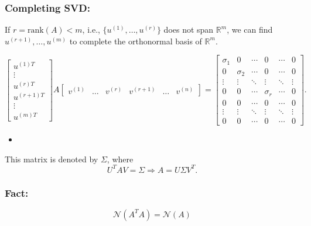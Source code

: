 \subsubsection{Completing SVD:}
\begin{derivation}
    If \( r = \text{rank}(A) < m \), i.e., \( \{ u^{(1)}, \dots, u^{(r)} \} \) does not span \( \mathbb{R}^m \), we can find \( u^{(r+1)}, \dots, u^{(m)} \) to complete the orthonormal basis of \( \mathbb{R}^m \).

    \[
    \begin{bmatrix}
    u^{(1) T} \\
    \vdots \\
    u^{(r) T} \\
    u^{(r+1) T} \\
    \vdots \\
    u^{(m) T}
    \end{bmatrix}
    A 
    \begin{bmatrix}
    v^{(1)} & \dots & v^{(r)} & v^{(r+1)} & \dots & v^{(n)}
    \end{bmatrix}
    =
    \begin{bmatrix}
    \sigma_1 & 0 & \cdots & 0 & \cdots & 0 \\
    0 & \sigma_2 & \cdots & 0 & \cdots & 0 \\
    \vdots & \vdots & \ddots & \vdots & \ddots & \vdots \\
    0 & 0 & \cdots & \sigma_r & \cdots & 0 \\
    0 & 0 & \cdots & 0 & \cdots & 0 \\
    \vdots & \vdots & \ddots & \vdots & \ddots & \vdots \\
    0 & 0 & \cdots & 0 & \cdots & 0
    \end{bmatrix}.
    \]
    \begin{itemize}
        \item 
    \end{itemize}

    This matrix is denoted by \( \Sigma \), where
    \[
    U^T A V = \Sigma \Rightarrow A = U \Sigma V^T.
    \]
\end{derivation}

\subsubsection{Fact:}
\begin{definition}
    \[
    \mathcal{N}(A^T A) = \mathcal{N}(A)
    \]
\end{definition}

